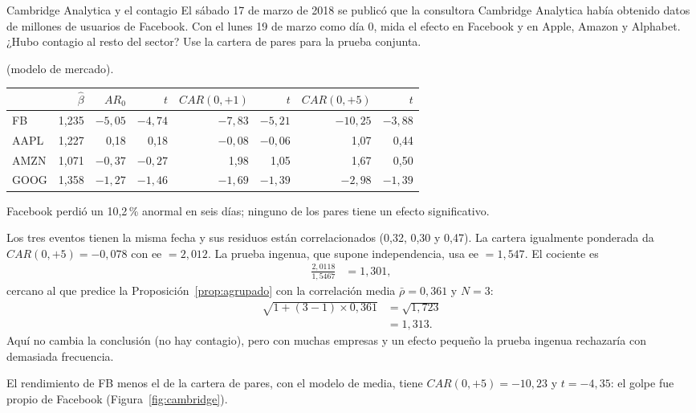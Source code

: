 \begin{ejresuelto}{Cambridge Analytica y el contagio}\label{ej:cambridge}
\enunciado El sábado 17 de marzo de 2018 se publicó que la consultora Cambridge Analytica había obtenido datos de millones de
usuarios de Facebook. Con el lunes 19 de marzo como día 0, mida el efecto en Facebook y en Apple, Amazon y Alphabet. ¿Hubo
contagio al resto del sector? Use la cartera de pares para la prueba conjunta.

\solucion
{} (modelo de mercado).
\begin{center}\small
\begin{tabular}{@{}lrrrrrrr@{}}
\toprule
 & $\hat\beta$ & $AR_0$ & $t$ & $CAR(0,+1)$ & $t$ & $CAR(0,+5)$ & $t$ \\
\midrule
FB   & 1,235 & $-5{,}05$ & $-4{,}74$ & $-7{,}83$ & $-5{,}21$ & $-10{,}25$ & $-3{,}88$ \\
AAPL & 1,227 & 0,18 & 0,18 & $-0{,}08$ & $-0{,}06$ & 1,07 & 0,44 \\
AMZN & 1,071 & $-0{,}37$ & $-0{,}27$ & 1,98 & 1,05 & 1,67 & 0,50 \\
GOOG & 1,358 & $-1{,}27$ & $-1{,}46$ & $-1{,}69$ & $-1{,}39$ & $-2{,}98$ & $-1{,}39$ \\
\bottomrule
\end{tabular}
\end{center}
Facebook perdió un 10,2\,\% anormal en seis días; ninguno de los pares tiene un efecto significativo.

 Los tres eventos tienen la misma fecha y sus residuos están
correlacionados (0,32, 0,30 y 0,47). La cartera igualmente ponderada da $CAR(0,+5)=-0{,}078$ con ee $=2{,}012$. La prueba ingenua,
que supone independencia, usa ee $=1{,}547$. El cociente es
\begin{align*}
  \frac{2{,}0118}{1{,}5467} &= 1{,}301,
\end{align*}
cercano al que predice la Proposición~\ref{prop:agrupado} con la correlación media $\bar\rho=0{,}361$ y $N=3$:
\begin{align*}
  \sqrt{1+(3-1)\times0{,}361} &= \sqrt{1{,}723}\\
                             &= 1{,}313 .
\end{align*}
Aquí no cambia la conclusión (no hay contagio), pero con muchas empresas y un efecto pequeño la prueba ingenua rechazaría
con demasiada frecuencia.

 El rendimiento de FB menos el de la cartera de pares, con el modelo de media, tiene
$CAR(0,+5)=-10{,}23$ y $t=-4{,}35$: el golpe fue propio de Facebook (Figura~\ref{fig:cambridge}).


\end{ejresuelto}
